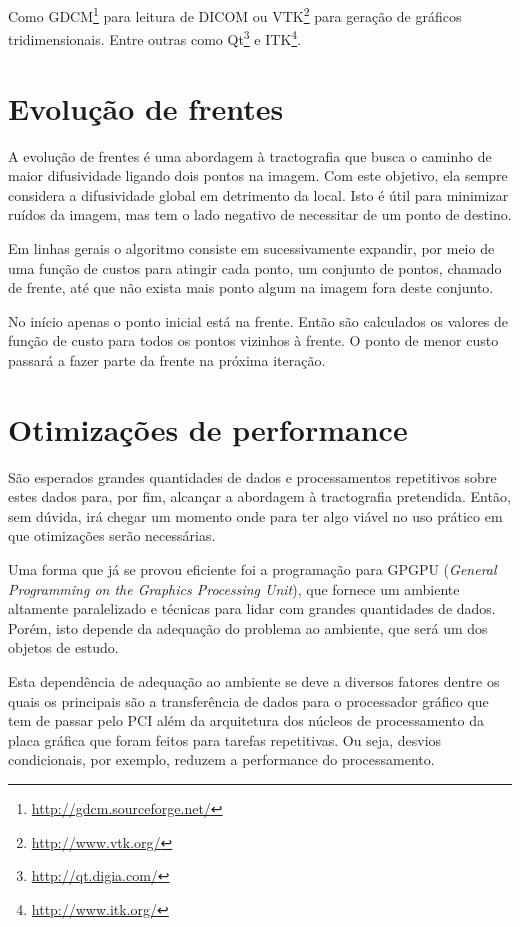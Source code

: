 \documentclass[a4paper,11pt]{report}
\begin{document}
  Como GDCM\footnote{\url{http://gdcm.sourceforge.net/}} para leitura de DICOM ou VTK\footnote{\url{http://www.vtk.org/}} para geração de gráficos tridimensionais. Entre outras como Qt\footnote{\url{http://qt.digia.com/}} e ITK\footnote{\url{http://www.itk.org/}}.
  
  \section{Evolução de frentes}
  A evolução de frentes é uma abordagem à tractografia que busca o caminho de maior difusividade ligando dois pontos na imagem. Com este objetivo, ela sempre considera a difusividade global em detrimento da local. Isto é útil para minimizar ruídos da imagem, mas tem o lado negativo de necessitar de um ponto de destino.
  
  Em linhas gerais o algoritmo consiste em sucessivamente expandir, por meio de uma função de custos para atingir cada ponto, um conjunto de pontos, chamado de frente, até que não exista mais ponto algum na imagem fora deste conjunto.
  
  No início apenas o ponto inicial está na frente. Então são calculados os valores de função de custo para todos os pontos vizinhos à frente. O ponto de menor custo passará a fazer parte da frente na próxima iteração.
  
  \section{Otimizações de performance}
  São esperados grandes quantidades de dados e processamentos repetitivos sobre estes dados para, por fim, alcançar a abordagem à tractografia pretendida. Então, sem dúvida, irá chegar um momento onde para ter algo viável no uso prático em que otimizações serão necessárias.
  
  Uma forma que já se provou eficiente foi a programação para GPGPU (\textit{General Programming on the Graphics Processing Unit}), que fornece um ambiente altamente paralelizado e técnicas para lidar com grandes quantidades de dados. Porém, isto depende da adequação do problema ao ambiente, que será um dos objetos de estudo.
  
  Esta dependência de adequação ao ambiente se deve a diversos fatores dentre os quais os principais são a transferência de dados para o processador gráfico que tem de passar pelo PCI além da arquitetura dos núcleos de processamento da placa gráfica que foram feitos para tarefas repetitivas. Ou seja, desvios condicionais, por exemplo, reduzem a performance do processamento.
\end{document}
